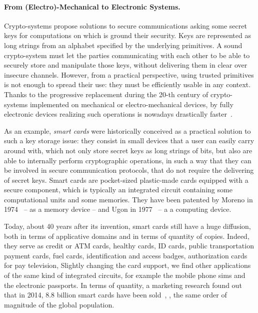 \paragraph{From (Electro)-Mechanical to Electronic Systems.}
Crypto-systems propose solutions to secure communications asking some secret keys for computations on which is ground their security.
Keys are represented as long strings from an alphabet specified by the underlying \glspl{primitive}.
A sound crypto-system must let the parties communicating with each other to be able to securely store and manipulate those keys, without delivering them in clear over insecure channels.
However, from a practical perspective, using trusted \glspl{primitive} is not enough to spread their use: they must be efficiently usable in any context.
Thanks to the progressive replacement during the 20-th century of crypto-systems implemented on mechanical or electro-mechanical devices, by fully electronic devices realizing such operations is nowadays drastically faster~\cite{singh_code_book_1999}. 

As an example, \emph{smart cards} were historically conceived as a practical solution to such a key storage issue: they consist in small devices that a user can easily carry around with, which not only store secret keys as long strings of bits, but also are able to internally perform cryptographic operations, in such a way that they can be involved in secure communication protocols, that do not require the delivering of secret keys.
Smart cards are pocket-sized plastic-made cards equipped with a secure component, which is typically an integrated circuit containing some computational units and some memories.
They have been patented by Moreno in 1974~\cite{moreno_methods_1974} -- as a memory device -- and Ugon in 1977~\cite{ugon_portable_1977} -- a a computing device.

Today, about 40 years after its invention, smart cards still have a huge diffusion, both in terms of applicative domains and in terms of quantity of copies.
Indeed, they serve as credit or ATM cards, healthy cards, ID cards, public transportation payment cards, fuel cards, identification and access badges, authorization cards for pay television, \etc{}
Slightly changing the card support, we find other applications of the same kind of integrated circuits, for example the mobile phone \glspl{sim} and the electronic passports.
In terms of quantity, a marketing research found out that in 2014, 8.8 billion smart cards have been sold~\cite{ABI}, \ie{}, the same order of magnitude of the global population.

